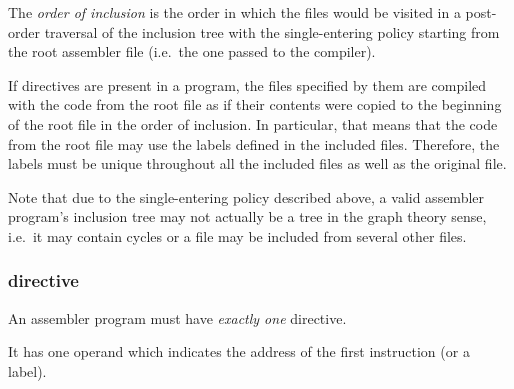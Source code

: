 The \textit{order of inclusion} is the order in which the files would be visited
in a post-order traversal of the inclusion tree with the single-entering policy
starting from the root  assembler file
(i.e.\ the one passed to the compiler).

If  directives are present in a program, the files specified by them
are compiled with the code from the root file as if their contents were
copied to the beginning of the root file in the order of inclusion.
In particular, that means that the code from the root file may use
the labels defined in the included files.
Therefore, the labels must be unique throughout all the included files
as well as the original file.

Note that due to the single-entering policy described above, a valid 
assembler program's inclusion tree may not actually be a tree in the graph
theory sense, i.e.\ it may contain cycles or a file may be included from several
other files.

\vspace{-0.35cm}

\hypertarget{directives:end}{
    \subsubsection{ directive}
}

\vspace{-0.2cm}

An assembler program must have \textit{exactly one}  directive.

It has one operand which indicates the address of the first instruction
(or a label).
